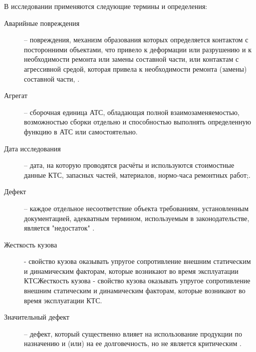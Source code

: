 В исследовании применяются следующие термины и определения:
\begin{description}
	\item
	[Аварийные повреждения] -- повреждения, механизм образования которых определяется контактом с посторонними объектами, что привело к деформации или разрушению и к необходимости ремонта или замены составной части, или контактам с агрессивной средой, которая привела к необходимости ремонта (замены) составной части, \cite[часть II, п. 1.5]{minust:2018}.
	\item
	[Агрегат] -- сборочная единица АТС, обладающая полной взаимозаменяемостью, возможностью сборки отдельно и способностью выполнять определенную функцию в АТС или самостоятельно.
	\item
	[Дата исследования]-- дата, на которую проводятся расчёты и используются стоимостные данные КТС, запасных частей, материалов, нормо-часа ремонтных работ;\autocite[часть II, п. 1.5]{dor:2016}.%
	\item
	[Дефект] --  каждое отдельное несоответствие объекта требованиям, установленным документацией, адекватным термином, используемым в законодательстве, является "недостаток" \autocite{58197:gost}.
	\item[Жесткость кузова] - свойство кузова оказывать упругое сопротивление
	внешним статическим и динамическим факторам, которые возникают во время эксплуатации КТСЖесткость кузова - свойство кузова оказывать упругое сопротивление 	внешним статическим и динамическим факторам, которые возникают во время эксплуатации КТС.
	\item
	[Значительный дефект] -- дефект, который существенно влияет на использование продукции по 	назначению и (или) на ее долговечность, но не является критическим  \autocite{58197:gost}.

\end{description}
